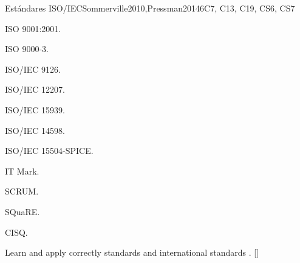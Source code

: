 \begin{syllabus}
\begin{unit}{Estándares ISO/IEC}{}{Sommerville2010,Pressman2014}{6}{C7, C13, C19, CS6, CS7}
\begin{topics}
    \item ISO 9001:2001.
    \item ISO 9000-3.
    \item ISO/IEC 9126.
    \item ISO/IEC 12207.
    \item ISO/IEC 15939.
    \item ISO/IEC 14598.
    \item ISO/IEC 15504-SPICE.
    \item IT Mark.
    \item SCRUM.
    \item SQuaRE.
    \item CISQ.
\end{topics}
\begin{learningoutcomes}%
    \item Learn and apply correctly standards and international standards . [\Usage]
\end{learningoutcomes}
\end{unit}

\begin{coursebibliography}
\end{coursebibliography}

\end{syllabus}
